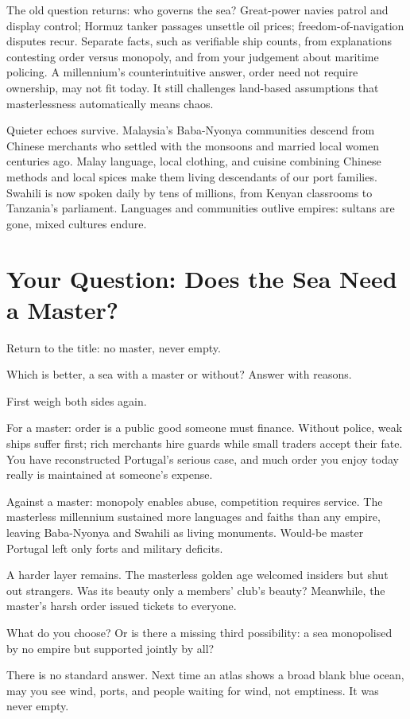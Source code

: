 The old question returns: who governs the sea? Great-power navies patrol and display control; Hormuz tanker passages unsettle oil prices; freedom-of-navigation disputes recur. Separate facts, such as verifiable ship counts, from explanations contesting order versus monopoly, and from your judgement about maritime policing. A millennium's counterintuitive answer, order need not require ownership, may not fit today. It still challenges land-based assumptions that masterlessness automatically means chaos.

Quieter echoes survive. Malaysia's Baba-Nyonya communities descend from Chinese merchants who settled with the monsoons and married local women centuries ago. Malay language, local clothing, and cuisine combining Chinese methods and local spices make them living descendants of our port families. Swahili is now spoken daily by tens of millions, from Kenyan classrooms to Tanzania's parliament. Languages and communities outlive empires: sultans are gone, mixed cultures endure.

\section{Your Question: Does the Sea Need a Master?}
Return to the title: no master, never empty.

Which is better, a sea with a master or without? Answer with reasons.

First weigh both sides again.

For a master: order is a public good someone must finance. Without police, weak ships suffer first; rich merchants hire guards while small traders accept their fate. You have reconstructed Portugal's serious case, and much order you enjoy today really is maintained at someone's expense.

Against a master: monopoly enables abuse, competition requires service. The masterless millennium sustained more languages and faiths than any empire, leaving Baba-Nyonya and Swahili as living monuments. Would-be master Portugal left only forts and military deficits.

A harder layer remains. The masterless golden age welcomed insiders but shut out strangers. Was its beauty only a members' club's beauty? Meanwhile, the master's harsh order issued tickets to everyone.

What do you choose? Or is there a missing third possibility: a sea monopolised by no empire but supported jointly by all?

There is no standard answer. Next time an atlas shows a broad blank blue ocean, may you see wind, ports, and people waiting for wind, not emptiness. It was never empty.
